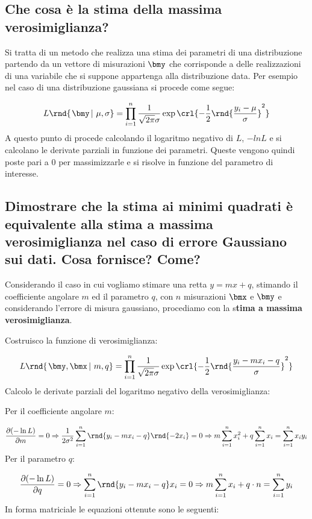 \documentclass[\main/main.tex]{subfiles}
\begin{document}
\subsection{Che cosa è la stima della massima verosimiglianza?}
Si tratta di un metodo che realizza una stima dei parametri di una distribuzione partendo da un vettore di misurazioni $\bmy$ che corrisponde a delle realizzazioni di una variabile che si suppone appartenga alla distribuzione data. Per esempio nel caso di una distribuzione gaussiana si procede come segue:

\[
  L\rnd{\left. \bmy\,\right\rvert\, \mu, \sigma} = \prod_{i=1}^n \frac{1}{\sqrt{2\pi}\sigma} \exp\crl{-\frac{1}{2}\rnd{\frac{y_i-\mu}{\sigma}}^2}
\]
A questo punto di procede calcolando il logaritmo negativo di $L$, $-ln{L}$ e si calcolano le derivate parziali in funzione dei parametri. Queste vengono quindi poste pari a 0 per massimizzarle e si risolve in funzione del parametro di interesse.

\subsection{Dimostrare che la stima ai minimi quadrati è equivalente alla stima a massima verosimiglianza nel caso di errore Gaussiano sui dati. Cosa fornisce? Come?}
Considerando il caso in cui vogliamo stimare una retta $y = mx+q$, stimando il coefficiente angolare $m$ ed il parametro $q$, con $n$ misurazioni $\bmx$ e $\bmy$ e considerando l'errore di misura gaussiano, procediamo con la s\textbf{tima a massima verosimiglianza}.

Costruisco la funzione di verosimiglianza:

\[
  L\rnd{\left. \bmy, \bmx \, \right\rvert\, m, q} = \prod_{i=1}^n \frac{1}{\sqrt{2\pi}\sigma} \exp\crl{-\frac{1}{2}\rnd{\frac{y_i-mx_i - q}{\sigma}}^2}
\]
Calcolo le derivate parziali del logaritmo negativo della verosimiglianza:

Per il coefficiente angolare $m$:

\[
  \frac{\partial (-\ln{L})}{\partial m} = 0 \Rightarrow \frac{1}{2\sigma^2} \sum^n_{i=1} \rnd{y_i - mx_i - q}\rnd{-2x_i} = 0 \Rightarrow  m\sum^n_{i=1} x^2_i + q\sum^n_{i=1}x_i = \sum^n_{i=1}x_iy_i
\]
Per il parametro $q$:

\[
  \frac{\partial (-\ln{L})}{\partial q} = 0 \Rightarrow \sum^n_{i=1}\rnd{y_i - mx_i -q}x_i = 0 \Rightarrow  m\sum^n_{i=1}x_i + q\cdot n = \sum^n_{i=1}y_i
\]
In forma matriciale le equazioni ottenute sono le seguenti:
\end{document}
